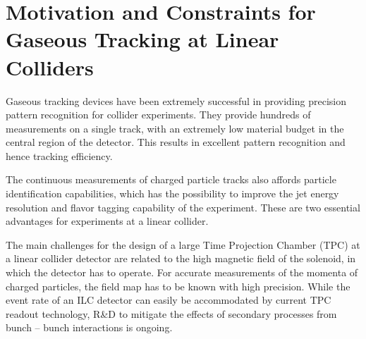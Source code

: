 \section{Motivation and Constraints for Gaseous Tracking at Linear Colliders}

Gaseous tracking devices have been extremely successful in providing precision pattern recognition for collider experiments. They provide hundreds of measurements on a single track, with an extremely low material budget in the central region of the detector. This results in excellent pattern recognition and hence tracking efficiency.

The continuous measurements of charged particle tracks also affords particle identification capabilities, which has the possibility to improve the jet energy resolution and flavor tagging capability of the experiment. These are two essential advantages for experiments at a linear collider.

The main challenges for the design of a large Time Projection Chamber (TPC) at a linear collider detector are related to the high magnetic field of the solenoid, in which the detector has to operate. For accurate measurements of the momenta of charged particles, the field map has to be known with high precision. While the event rate of an ILC detector can easily be accommodated by current TPC readout technology, R\&D to mitigate the effects of secondary processes from bunch -- bunch interactions is ongoing.
